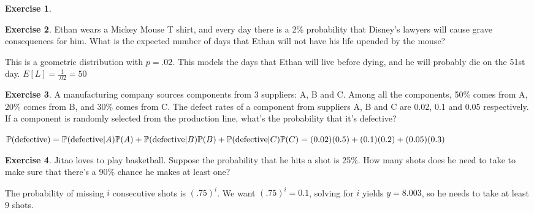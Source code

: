 \documentclass[12pt]{amsart}
\theoremstyle{definition}
\newtheorem{exercise}{Exercise}
\numberwithin{equation}{section}
\theoremstyle{plain}
\renewcommand{\P}{\mathbb{P}}
\begin{document}
\begin{exercise}
\end{exercise}

 


\begin{exercise}
    Ethan wears a Mickey Mouse T shirt, and every day there is a 2\% probability that Disney's lawyers will cause grave consequences for him. What is the expected number of days that Ethan will not have his life upended by the mouse?
    \begin{answer}
    This is a geometric distribution with $p = .02$. This models the days that Ethan will live before dying, and he will probably die on the 51st day.
    $E[L] = \frac{1}{.02} = 50$
    
    \end{answer}
\end{exercise}

 

\begin{exercise}
    A manufacturing company sources components from 3 suppliers: A, B and C. Among all the components, 50\% comes from A, 20\% comes from B, and 30\% comes from C. The defect rates of a component from suppliers A, B and C are 0.02, 0.1 and 0.05 respectively. If a component is randomly selected from the production line, what’s the probability that it’s defective? %
    \begin{answer}
        $
            \P(\text{defective}) = \P(\text{defective}|A)\P(A) + \P(\text{defective}|B)\P(B) + \P(\text{defective}|C)\P(C) = 
            \\
            (0.02)(0.5) + (0.1)(0.2) + (0.05)(0.3) 
        $
    \end{answer}
\end{exercise}

 

\begin{exercise}
    Jitao loves to play basketball. Suppose the probability that he hits a shot is 25\%. How many shots does he need to take to make sure that there’s a 90\% chance he makes at least one? %
    \begin{answer}
        The probability of missing $i$ consecutive shots is $(.75)^i$. We want $(.75)^i = 0.1$, solving for $i$ yields $y = 8.003$, so he needs to take at least $9$ shots.
    \end{answer}
\end{exercise}
\end{document}

